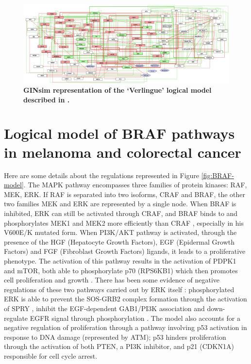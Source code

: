 \documentclass[a4paper,12pt,twoside,onecolumn,openright,final,oldfontcommands]{memoir}
\begin{document}
\begin{figure}

{\centering \includegraphics[width=0.9\linewidth]{fig/Verlingue} 

}

\caption[Graphical abstract of PROFILE method to personalize logical models with omics data]{\textbf{GINsim representation of the `Verlingue'
logical model described in \citet{verlingue2016silico}.}}\label{fig:Verlingue}
\end{figure}




\section{Logical model of BRAF pathways in melanoma and colorectal
cancer}\label{appendix-pantolini}

Here are some details about the regulations represented in Figure
\ref{fig:BRAF-model}. The MAPK pathway encompasses three families of
protein kinases: RAF, MEK, ERK. If RAF is separated into two isoforms,
CRAF and BRAF, the other two families MEK and ERK are represented by a
single node. When BRAF is inhibited, ERK can still be activated through
CRAF, and BRAF binds to and phosphorylates MEK1 and MEK2 more
efficiently than CRAF \citep{wellbrock2004raf}, especially in his
V600E/K mutated form. When PI3K/AKT pathway is activated, through the
presence of the HGF (Hepatocyte Growth Factors), EGF (Epidermal Growth
Factors) and FGF (Fibroblast Growth Factors) ligands, it leads to a
proliferative phenotype. The activation of this pathway results in the
activation of PDPK1 and mTOR, both able to phosphorylate p70 (RPS6KB1)
which then promotes cell proliferation and growth
\citep{uniprot2019uniprot}. There has been some evidence of negative
regulations of these two pathways carried out by ERK itself
\citep{lake2016negative}: phosphorylated ERK is able to prevent the
SOS-GRB2 complex formation through the activation of SPRY
\citep{edwin2009intermolecular}, inhibit the EGF-dependent GAB1/PI3K
association \citep{lehr2004identification} and down-regulate EGFR signal
through phosphorylation \citep{lake2016negative}. The model also
accounts for a negative regulation of proliferation through a pathway
involving p53 activation in response to DNA damage (represented by ATM);
p53 hinders proliferation through the activation of both PTEN, a PI3K
inhibitor, and p21 (CDKN1A) responsible for cell cycle arrest.
\end{document}
